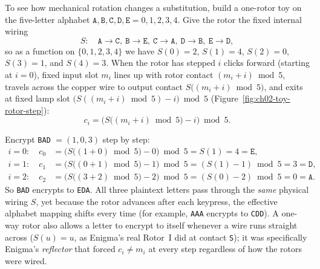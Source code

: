 To see how mechanical rotation changes a substitution, build a one-rotor toy on the five-letter
alphabet $\texttt{A}, \texttt{B}, \texttt{C}, \texttt{D}, \texttt{E} = 0,1,2,3,4$. Give the
rotor the fixed internal wiring
\[
  S: \quad \texttt{A}\to\texttt{C},\ \texttt{B}\to\texttt{E},\ \texttt{C}\to\texttt{A},\
  \texttt{D}\to\texttt{B},\ \texttt{E}\to\texttt{D},
\]
so as a function on $\{0,1,2,3,4\}$ we have $S(0)=2$, $S(1)=4$, $S(2)=0$, $S(3)=1$, and
$S(4)=3$. When the rotor has stepped $i$ clicks forward (starting at $i = 0$), fixed input slot
$m_i$ lines up with rotor contact $(m_i + i) \bmod 5$, travels across the copper wire to output
contact $S\bigl((m_i + i) \bmod 5\bigr)$, and exits at fixed lamp slot $\bigl(S((m_i + i) \bmod
5) - i\bigr) \bmod 5$ (Figure~\ref{fig:ch02-toy-rotor-step}):
\[
  c_i = \bigl(S\bigl((m_i + i)\bmod 5\bigr) - i\bigr)\bmod 5.
\]

Encrypt \texttt{BAD} $= (1, 0, 3)$ step by step:
\begin{align*}
i=0:\quad c_0 &= \bigl(S\bigl((1+0)\bmod 5\bigr) - 0\bigr)\bmod 5 = S(1) = 4 = \texttt{E},\\
i=1:\quad c_1 &= \bigl(S\bigl((0+1)\bmod 5\bigr) - 1\bigr)\bmod 5 = (S(1) - 1)\bmod 5 = 3 = \texttt{D},\\
i=2:\quad c_2 &= \bigl(S\bigl((3+2)\bmod 5\bigr) - 2\bigr)\bmod 5 = (S(0) - 2)\bmod 5 = 0 = \texttt{A}.
\end{align*}
So \texttt{BAD} encrypts to \texttt{EDA}. All three plaintext letters pass through the
\emph{same} physical wiring $S$, yet because the rotor advances after each keypress, the
effective alphabet mapping shifts every time (for example, \texttt{AAA} encrypts to
\texttt{CDD}). A one-way rotor also allows a letter to encrypt to itself whenever a wire runs
straight across ($S(u)=u$, as Enigma's real Rotor~I did at contact \texttt{S}); it was
specifically Enigma's \emph{reflector} that forced $c_i \neq m_i$ at every step regardless of
how the rotors were wired.

